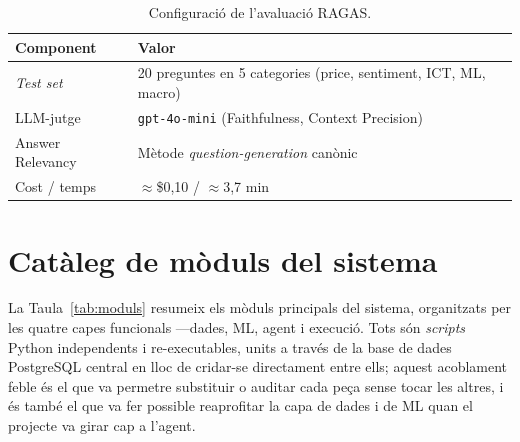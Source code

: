 \documentclass[10pt,twocolumn,a4paper]{article}
\begin{document}
\begin{table}[H]
\centering
\caption{Configuració de l'avaluació RAGAS.}
\label{tab:ragas-setup}
\small
\begin{tabular}{@{}L{4.5cm}L{9cm}@{}}
\toprule
\textbf{Component} & \textbf{Valor} \\
\midrule
\textit{Test set}  & 20 preguntes en 5 categories (price, sentiment, ICT, ML, macro) \\
LLM-jutge          & \texttt{gpt-4o-mini} (Faithfulness, Context Precision) \\
Answer Relevancy   & Mètode \textit{question-generation} canònic \\
Cost / temps       & $\approx$\$0,10 / $\approx$3,7 min \\
\bottomrule
\end{tabular}
\end{table}

\section{Catàleg de mòduls del sistema}
\label{ap:moduls}
La Taula~\ref{tab:moduls} resumeix els mòduls principals del sistema, organitzats per
les quatre capes funcionals ---dades, ML, agent i execució. Tots són \textit{scripts}
Python independents i re-executables, units a través de la base de dades PostgreSQL
central en lloc de cridar-se directament entre ells; aquest acoblament feble és el
que va permetre substituir o auditar cada peça sense tocar les altres, i és també el
que va fer possible reaprofitar la capa de dades i de ML quan el projecte va girar
cap a l'agent.
\end{document}
